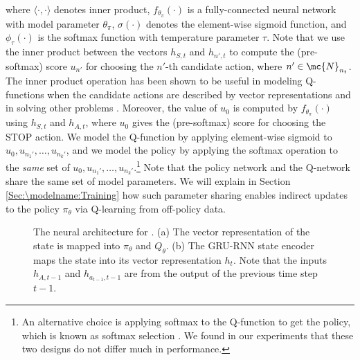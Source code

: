 \documentclass{article}
\begin{document}
	where $\langle \cdot, \cdot \rangle$ denotes inner product, $f_{\theta_\pi}(\cdot)$ is a fully-connected neural network with model parameter $\theta_\pi$, $\sigma(\cdot)$ denotes the element-wise sigmoid function, and $\phi_{\tau}(\cdot)$ is the softmax function with temperature parameter $\tau$. Note that we use the inner product between the vectors $h_{S,t}$ and $h_{n',t}$ to compute the (pre-softmax) score $u_{n'}$ for choosing the $n'$-th candidate action, where $n' \in \mc{N}_{n_t}$. The inner product operation has been shown to be useful in modeling Q-functions when the candidate actions are described by vector representations \cite{he2015deep,chen2017q} and in solving other problems \cite{vinyals2015pointer,bello2016neural}. Moreover, the value of $u_0$ is computed by $f_{\theta_\pi}(\cdot)$ using $h_{S,t}$ and $h_{A,t}$, where $u_0$ gives the (pre-softmax) score for choosing the STOP action. We model the Q-function by applying element-wise sigmoid to $u_0,u_{n_1'},\ldots,u_{n_k'}$, and we model the policy by applying the softmax operation to the \emph{same} set of $u_0,u_{n_1'},\ldots,u_{n_k'}$.\footnote{An alternative choice is applying softmax to the Q-function to get the policy, which is known as softmax selection \cite{sutton1998reinforcement}. We found in our experiments that these two designs do not differ much in performance.} Note that the policy network and the Q-network share the same set of model parameters. We will explain in Section \ref{Sec:\modelname:Training} how such parameter sharing enables indirect updates to the policy $\pi_{\theta}$ via Q-learning from off-policy data. 
	
	
	
	\begin{figure}[t!]
		\centering
		\hfil
		\caption{{\small The neural architecture for \modelname. (a) The vector representation of the state is mapped into $\pi_{\theta}$ and $Q_{\theta}$. (b) The GRU-RNN state encoder maps the state into its vector representation $h_t$. Note that the inputs $h_{A,t-1}$ and $h_{a_{t-1},t-1}$ are from the output of the previous time step $t-1$.}}
		\label{fig:DeepRNN}
	\end{figure}
	
\end{document}
